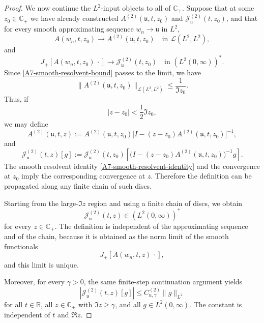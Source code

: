 \documentclass[10pt]{article}
\numberwithin{equation}{section}
\numberwithin{theorem}{section}
\begin{document}
\begin{appendix}
\begin{proof}
We now continue the \(L^2\)-input objects to all of \(\mathbb C_+\). Suppose that
at some \(z_0\in\mathbb C_+\) we have already constructed
\(A^{(2)}(\mathfrak u,t,z_0)\) and
\(\mathcal J^{(2)}_{\mathfrak u}(t,z_0)\), and that for every smooth
approximating sequence \(w_n\to\mathfrak u\) in \(L^2\),
\[
A(w_n,t,z_0)\to A^{(2)}(\mathfrak u,t,z_0)
\quad\text{in }\mathcal L(L^2,L^2),
\]
and
\[
J_+[A(w_n,t,z_0)\,\cdot]
\to
\mathcal J^{(2)}_{\mathfrak u}(t,z_0)
\quad\text{in }(L^2(0,\infty))^*.
\]
Since \eqref{A7-smooth-resolvent-bound} passes to the limit, we have
\[
\|A^{(2)}(\mathfrak u,t,z_0)\|_{\mathcal L(L^2,L^2)}
\le
\frac1{\Im z_0}.
\]
Thus, if
\[
|z-z_0|<\frac12\Im z_0,
\]
we may define
\begin{equation}
\label{A7-A2-continuation}
A^{(2)}(\mathfrak u,t,z)
:=
A^{(2)}(\mathfrak u,t,z_0)
\bigl[
I-(z-z_0)A^{(2)}(\mathfrak u,t,z_0)
\bigr]^{-1},
\end{equation}
and
\begin{equation}
\label{A7-J2-continuation}
\mathcal J^{(2)}_{\mathfrak u}(t,z)[g]
:=
\mathcal J^{(2)}_{\mathfrak u}(t,z_0)
\left[
\bigl(
I-(z-z_0)A^{(2)}(\mathfrak u,t,z_0)
\bigr)^{-1}g
\right].
\end{equation}
The smooth resolvent identity \eqref{A7-smooth-resolvent-identity} and the
convergence at \(z_0\) imply the corresponding convergence at \(z\). Therefore
the definition can be propagated along any finite chain of such discs.

Starting from the large-\(\Im z\) region and using a finite chain of discs, we
obtain
\[
\mathcal J^{(2)}_{\mathfrak u}(t,z)\in (L^2(0,\infty))^*
\]
for every \(z\in\mathbb C_+\). The definition is independent of the approximating
sequence and of the chain, because it is obtained as the norm limit of the smooth
functionals
\[
J_+[A(w_n,t,z)\,\cdot],
\]
and this limit is unique.

Moreover, for every \(\gamma>0\), the same finite-step continuation argument yields
\begin{equation}
\label{A7-J2-uniform-bound}
|\mathcal J^{(2)}_{\mathfrak u}(t,z)[g]|
\le
C^{(2)}_{\mathfrak u,\gamma}\|g\|_{L^2}
\end{equation}
for all \(t\in\mathbb R\), all \(z\in\mathbb C_+\) with
\(\Im z\ge\gamma\), and all \(g\in L^2(0,\infty)\). The constant is independent
of \(t\) and \(\Re z\).


\end{proof}
\end{appendix}
\end{document}
